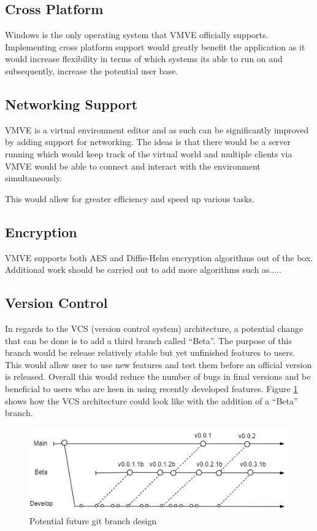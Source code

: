 \documentclass[11pt]{article}
\begin{document}
\subsection{Cross Platform}
Windows is the only operating system that VMVE officially supports. Implementing
cross platform support would greatly benefit the application as it would
increase flexibility in terms of which systems its able to run on and
subsequently, increase the potential user base.

\subsection{Networking Support}
VMVE is a virtual environment editor and as such can be significantly improved
by adding support for networking. The ideas is that there would be a server
running which would keep track of the virtual world and multiple clients via
VMVE would be able to connect and interact with the environment simultaneously.

This would allow for greater efficiency and speed up various tasks.

\subsection{Encryption}
VMVE supports both AES and Diffie-Helm encryption algorithms out of the box.
Additional work should be carried out to add more algorithms such as.....

\subsection{Version Control}
In regards to the VCS (version control system) architecture, a potential change
that can be done is to add a third branch called ``Beta''. The purpose of this
branch would be release relatively stable but yet unfinished features to users.
This would allow user to use new features and test them before an official
version is released. Overall this would reduce the number of bugs in final
versions and be beneficial to users who are keen in using recently developed
features. Figure \ref{fig:futurebrancharch} shows how the VCS architecture could
look like with the addition of a ``Beta'' branch.

\begin{figure}[h!]
  \centering
  \includegraphics[width=\textwidth]{images/future_branch_design.png}
  \caption{Potential future git branch design}
  \label{fig:futurebrancharch}
\end{figure}
\end{document}
